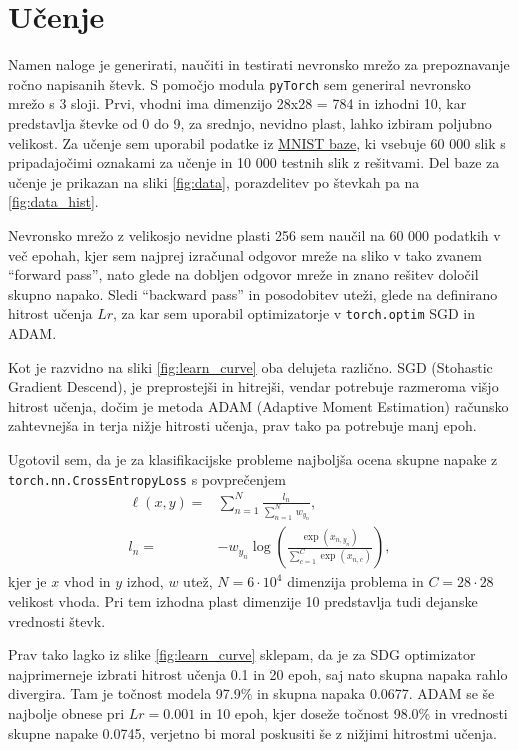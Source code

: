 \section{Učenje}

Namen naloge je generirati, naučiti in testirati nevronsko mrežo za prepoznavanje ročno napisanih števk. S pomočjo modula \texttt{pyTorch} sem generiral nevronsko mrežo s 3 sloji. Prvi, vhodni ima dimenzijo 28x28 = 784 in izhodni 10, kar predstavlja števke od 0 do 9, za srednjo, nevidno plast, lahko izbiram poljubno velikost. Za učenje sem uporabil podatke iz \href{https://yann.lecun.com/exdb/mnist/}{MNIST baze}, ki vsebuje 60 000 slik s pripadajočimi oznakami za učenje in 10 000 testnih slik z rešitvami. Del baze za učenje je prikazan na sliki \ref{fig:data}, porazdelitev po števkah pa na \ref{fig:data_hist}.

Nevronsko mrežo z velikosjo nevidne plasti 256 sem naučil na 60 000 podatkih v več epohah, kjer sem najprej izračunal odgovor mreže na sliko v tako zvanem ``forward pass'', nato glede na dobljen odgovor mreže in znano rešitev določil skupno napako. Sledi ``backward pass'' in posodobitev uteži, glede na definirano hitrost učenja $Lr$, za kar sem uporabil optimizatorje v \texttt{torch.optim} SGD in ADAM.

Kot je razvidno na sliki \ref{fig:learn_curve} oba delujeta različno. SGD (Stohastic Gradient Descend), je preprostejši in hitrejši, vendar potrebuje razmeroma višjo hitrost učenja, dočim je metoda ADAM (Adaptive Moment Estimation) računsko zahtevnejša in terja nižje hitrosti učenja, prav tako pa  potrebuje manj epoh.

Ugotovil sem, da je za klasifikacijske probleme najboljša ocena skupne napake z \\\texttt{torch.nn.CrossEntropyLoss} s povprečenjem
\begin{align}
    \ell(x, y) =& \sum_{n=1}^{N} \frac{l_n}{\sum_{n=1}^{N}\, w_{y_n}} , \\\nonumber
    l_n =& - w_{y_n} \log \left( \frac{\exp(x_{n, y_n})}{\sum_{c=1}^{C} \exp(x_{n,c})} \right),
\end{align}
kjer je $x$ vhod in $y$ izhod, $w$ utež, $N=6 \cdot 10^4$ dimenzija problema in $C=28\cdot28$ velikost vhoda. Pri tem izhodna plast dimenzije 10 predstavlja tudi dejanske vrednosti števk.

Prav tako lagko iz slike \ref{fig:learn_curve} sklepam, da je za SDG optimizator najprimerneje izbrati hitrost učenja 0.1 in 20 epoh, saj nato skupna napaka rahlo divergira. Tam je točnost modela 97.9\% in skupna napaka 0.0677. ADAM se še najbolje obnese pri $Lr=0.001$ in 10 epoh, kjer doseže točnost 98.0\% in vrednosti skupne napake 0.0745, verjetno bi moral poskusiti še z nižjimi hitrostmi učenja.

